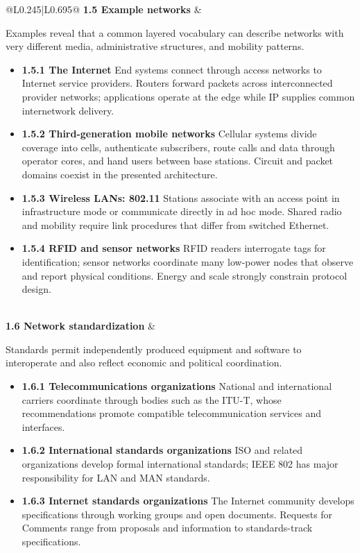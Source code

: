 \documentclass[10pt,letterpaper]{article}
\begin{document}
\begin{longtable}{@{}L{0.245\textwidth}|L{0.695\textwidth}@{}}
\textbf{1.5 Example networks} & \begin{minipage}[t]{\linewidth}\raggedright Examples reveal that a common layered vocabulary can describe networks with very different media, administrative structures, and mobility patterns.\par\begin{itemize}\item \textbf{1.5.1 The Internet} End systems connect through access networks to Internet service providers. Routers forward packets across interconnected provider networks; applications operate at the edge while IP supplies common internetwork delivery.\item \textbf{1.5.2 Third-generation mobile networks} Cellular systems divide coverage into cells, authenticate subscribers, route calls and data through operator cores, and hand users between base stations. Circuit and packet domains coexist in the presented architecture.\item \textbf{1.5.3 Wireless LANs: 802.11} Stations associate with an access point in infrastructure mode or communicate directly in ad hoc mode. Shared radio and mobility require link procedures that differ from switched Ethernet.\item \textbf{1.5.4 RFID and sensor networks} RFID readers interrogate tags for identification; sensor networks coordinate many low-power nodes that observe and report physical conditions. Energy and scale strongly constrain protocol design.\end{itemize}\end{minipage} \\ \hline
{}\textbf{1.6 Network standardization} & \begin{minipage}[t]{\linewidth}\raggedright Standards permit independently produced equipment and software to interoperate and also reflect economic and political coordination.\par\begin{itemize}\item \textbf{1.6.1 Telecommunications organizations} National and international carriers coordinate through bodies such as the ITU-T, whose recommendations promote compatible telecommunication services and interfaces.\item \textbf{1.6.2 International standards organizations} ISO and related organizations develop formal international standards; IEEE 802 has major responsibility for LAN and MAN standards.\item \textbf{1.6.3 Internet standards organizations} The Internet community develops specifications through working groups and open documents. Requests for Comments range from proposals and information to standards-track specifications.\end{itemize}\end{minipage} \\ \hline

\end{longtable}
\end{document}

